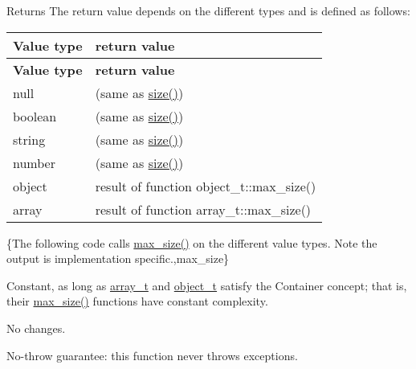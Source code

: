 \begin{DoxyReturn}{Returns}
The return value depends on the different types and is defined as follows\+: \tabulinesep=1mm
\begin{longtabu} spread 0pt [c]{*{2}{|X[-1]}|}
\hline
\rowcolor{\tableheadbgcolor}\textbf{ Value type  }&\textbf{ return value   }\\
\endfirsthead
\hline
\endfoot
\hline
\rowcolor{\tableheadbgcolor}\textbf{ Value type  }&\textbf{ return value   }\\
\endhead
null  &{} (same as {\ttfamily \mbox{\hyperlink{classnlohmann_1_1basic__json_a25e27ad0c6d53c01871c5485e1f75b96}{size()}}})   \\
boolean  &{} (same as {\ttfamily \mbox{\hyperlink{classnlohmann_1_1basic__json_a25e27ad0c6d53c01871c5485e1f75b96}{size()}}})   \\
string  &{} (same as {\ttfamily \mbox{\hyperlink{classnlohmann_1_1basic__json_a25e27ad0c6d53c01871c5485e1f75b96}{size()}}})   \\
number  &{} (same as {\ttfamily \mbox{\hyperlink{classnlohmann_1_1basic__json_a25e27ad0c6d53c01871c5485e1f75b96}{size()}}})   \\
object  &result of function {\ttfamily object\+\_\+t\+::max\+\_\+size()}   \\
array  &result of function {\ttfamily array\+\_\+t\+::max\+\_\+size()}   \\
\end{longtabu}

\end{DoxyReturn}
\{The following code calls {\ttfamily \mbox{\hyperlink{classnlohmann_1_1basic__json_a2f47d3c6a441c57dd2be00449fbb88e1}{max\+\_\+size()}}} on the different value types. Note the output is implementation specific.,max\+\_\+size\}

Constant, as long as \mbox{\hyperlink{classnlohmann_1_1basic__json_ae095578e03df97c5b3991787f1056374}{array\+\_\+t}} and \mbox{\hyperlink{classnlohmann_1_1basic__json_aa1eb13d5aa86f80cbee6c58e90fbaf49}{object\+\_\+t}} satisfy the Container concept; that is, their {\ttfamily \mbox{\hyperlink{classnlohmann_1_1basic__json_a2f47d3c6a441c57dd2be00449fbb88e1}{max\+\_\+size()}}} functions have constant complexity.

No changes.

No-\/throw guarantee\+: this function never throws exceptions.

